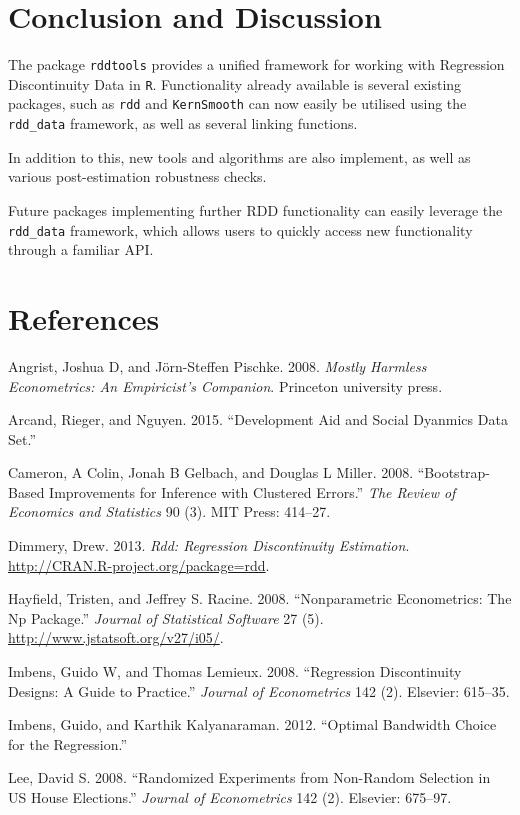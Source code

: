 \documentclass[article]{jss}
\begin{document}
\section{Conclusion and Discussion}\label{conclusion-and-discussion}

The package \texttt{rddtools} provides a unified framework for working
with Regression Discontinuity Data in \texttt{R}. Functionality already
available is several existing packages, such as \texttt{rdd} and
\texttt{KernSmooth} can now easily be utilised using the
\texttt{rdd\_data} framework, as well as several linking functions.

In addition to this, new tools and algorithms are also implement, as
well as various post-estimation robustness checks.

Future packages implementing further RDD functionality can easily
leverage the \texttt{rdd\_data} framework, which allows users to quickly
access new functionality through a familiar API.

\section*{References}\label{references}

Angrist, Joshua D, and J{ö}rn-Steffen Pischke. 2008. \emph{Mostly
Harmless Econometrics: An Empiricist's Companion}. Princeton university
press.

Arcand, Rieger, and Nguyen. 2015. ``Development Aid and Social Dyanmics
Data Set.''

Cameron, A Colin, Jonah B Gelbach, and Douglas L Miller. 2008.
``Bootstrap-Based Improvements for Inference with Clustered Errors.''
\emph{The Review of Economics and Statistics} 90 (3). MIT Press:
414--27.

Dimmery, Drew. 2013. \emph{Rdd: Regression Discontinuity Estimation}.
\url{http://CRAN.R-project.org/package=rdd}.

Hayfield, Tristen, and Jeffrey S. Racine. 2008. ``Nonparametric
Econometrics: The Np Package.'' \emph{Journal of Statistical Software}
27 (5). \url{http://www.jstatsoft.org/v27/i05/}.

Imbens, Guido W, and Thomas Lemieux. 2008. ``Regression Discontinuity
Designs: A Guide to Practice.'' \emph{Journal of Econometrics} 142 (2).
Elsevier: 615--35.

Imbens, Guido, and Karthik Kalyanaraman. 2012. ``Optimal Bandwidth
Choice for the Regression.''

Lee, David S. 2008. ``Randomized Experiments from Non-Random Selection
in US House Elections.'' \emph{Journal of Econometrics} 142 (2).
Elsevier: 675--97.
\end{document}
